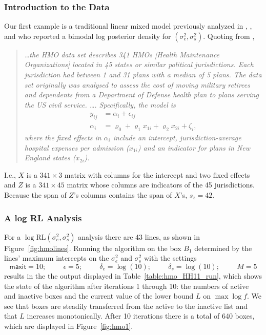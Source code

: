 \documentclass{report}
\newcommand{\textcompute}{\textsf}
\newcommand{\RLorig}{\text{RL}}
\newcommand{\logRLorig}{\log\RLorig}
\newcommand{\sigssq}{\sigma_s^2}
\newcommand{\sigesq}{\sigma_e^2}
\newcommand{\logRLssorig}{\logRLorig(\sigesq,\sigssq)}
\newcommand{\maxit}{\textcompute{maxit}}
\begin{document}
\subsubsection{Introduction to the Data}
Our first example is a traditional linear mixed model previously analyzed in \cite{hodges:98}, \cite{hodges:2013}, and \cite{henn&hodges:2014} who reported a bimodal log posterior density for $(\sigesq,\sigssq)$.  Quoting from \cite{henn&hodges:2014},
\begin{quote}
\itshape
\dots the HMO data set describes 341 HMOs [Health Maintenance Organizations] located in 45 states or similar political jurisdictions.  Each jurisdiction had between 1 and 31 plans with a median of 5 plans.  The data set originally was analysed to assess the cost of moving military retirees and dependents from a Department of Defense health plan to plans serving the US civil service.  \dots.  Specifically, the model is
\begin{equation*}
\begin{split}
	y_{ij} &= \alpha_i + \epsilon_{ij}\\
	\alpha_i &= \varrho_0 + \varrho_1x_{1i} + \varrho_2x_{2i} + \zeta_i,
\end{split}
\end{equation*}
where the fixed effects in $\alpha_i$ include an intercept, jurisdiction-average hospital expenses per admission ($x_{1i}$) and an indicator for plans in New England states ($x_{2i}$).

\upshape
\end{quote}
I.e., $X$ is a $341 \times 3$ matrix with columns for the intercept and two fixed effects and $Z$ is a $341 \times 45$ matrix whose columns are indicators of the 45 jurisdictions.  Because the span of $Z$'s columns contains the span of $X$'s, $s_z = 42$.  

\subsubsection{A log RL Analysis}
For a $\logRLssorig$ analysis there are 43 lines, as shown in Figure~\ref{fig:hmolines}.
Running the algorithm on the box $B_1$ determined by the lines' maximum intercepts on the $\sigesq$ and $\sigssq$ with the settings
\begin{equation*}
	\maxit=10; \hspace{1cm} \epsilon=5; \hspace{1cm}
	\delta_e=\log(10); \hspace{1cm} \delta_s=\log(10); \hspace{1cm} M=5
\end{equation*}
results in the the output displayed in Table~\ref{table:hmo_HH11_run}, which shows the state of the algorithm after iterations 1 through 10: the numbers of active and inactive boxes and the current value of the lower bound $L$ on $\max\log f$.  We see that boxes are steadily transferred from the active to the inactive list and that $L$ increases monotonically.  After 10 iterations there is a total of 640 boxes, which are displayed in Figure~\ref{fig:hmo1}.
\end{document}
